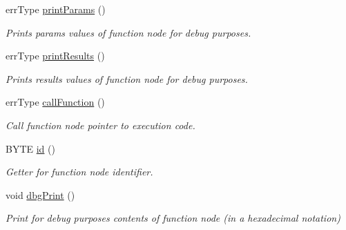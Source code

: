 \begin{DoxyCompactItemize}
$$errType \hyperlink{classfunctionNode_aa20f0bc36f83b96fc4aaf7405cf2c077}{printParams} ()
\begin{DoxyCompactList}\small\item\em Prints params values of function node for debug purposes. \item\end{DoxyCompactList}\item 
errType \hyperlink{classfunctionNode_a274556d191f3766fd06d876e8b475baf}{printResults} ()
\begin{DoxyCompactList}\small\item\em Prints results values of function node for debug purposes. \item\end{DoxyCompactList}\item 
errType \hyperlink{classfunctionNode_ab08f0119bba638d4ac5e84c3511bbd8f}{callFunction} ()
\begin{DoxyCompactList}\small\item\em Call function node pointer to execution code. \item\end{DoxyCompactList}\item 
BYTE \hyperlink{classfunctionNode_a90aec9c3bc52b160c474b84213467e22}{id} ()
\begin{DoxyCompactList}\small\item\em Getter for function node identifier. \item\end{DoxyCompactList}\item 
void \hyperlink{classfunctionNode_aba1d48fc99059a64fbeeea69971d0acb}{dbgPrint} ()
\begin{DoxyCompactList}\small\item\em Print for debug purposes contents of function node (in a hexadecimal notation) \item\end{DoxyCompactList}\end{DoxyCompactItemize}
